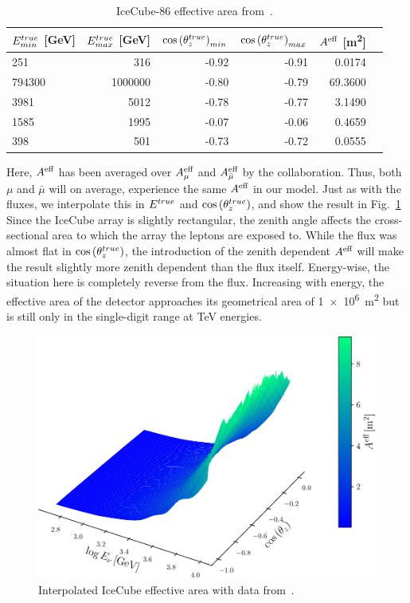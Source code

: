 \begin{table}[ht]
    \centering
    \begin{tabular}{lrrrrr}
        \hline \hline
        $E^{true}_{min}$ [\si{\GeV}] &     $E^{true}_{max}$ [\si{\GeV}]&   $\cos{(\theta_z^{true})}_{min}$ &   $\cos{(\theta_z^{true})}_{max}$ &     $A^\text{eff}$ [\si{\metre\squared}] \\
        \hline
             251 &      316 &  -0.92 &  -0.91 &   0.0174 \\
          794300 &  1000000 &  -0.80 &  -0.79 &  69.3600 \\
            3981 &     5012 &  -0.78 &  -0.77 &   3.1490 \\
            1585 &     1995 &  -0.07 &  -0.06 &   0.4659 \\
            398 &      501 &  -0.73 &  -0.72 &   0.0555 \\
        \hline \hline
        \end{tabular}
    \caption{IceCube-86 effective area from~\cite{ICaeff}.}
    \label{table:aeff}
\end{table}

Here, $A^\text{eff}$ has been averaged over $A^\text{eff}_\mu$ and $A^\text{eff}_{\bar{\mu}}$ by the collaboration. Thus, both $\mu$ and $\bar\mu$ will on average, experience the same $A^\text{eff}$ in our model. 
Just as with the fluxes, we interpolate this in $E^{true}$ and $\cos{(\theta_z^{true})}$, and show the result in Fig.~\ref{fig:aeff}
Since the IceCube array is slightly rectangular, the zenith angle affects the cross-sectional area to which the array the leptons are exposed to.
While the flux was almost flat in $\cos{(\theta_z^{true})}$, the introduction of the zenith dependent $A^\text{eff}$ will make the result slightly more zenith dependent than the flux itself. Energy-wise, the situation here is completely reverse from the flux. Increasing with energy, the effective area of the detector approaches its geometrical area of \SI{1e6}{\metre^2} but is still only in the single-digit range at \si{\TeV} energies.

\begin{figure}[ht]%
    \centering
    \includegraphics[scale=0.6]{figures/aeff.pdf}
    \caption{Interpolated IceCube effective area with data from~\cite{ICaeff}.}
    \label{fig:aeff}
\end{figure}

